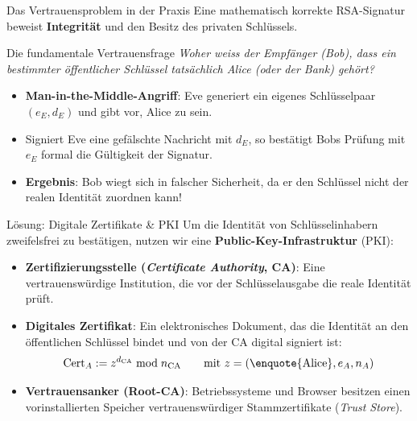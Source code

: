 \begin{frame}{Das Vertrauensproblem in der Praxis}
	Eine mathematisch korrekte RSA-Signatur beweist \textbf{Integrität} und den Besitz des privaten Schlüssels.
	
	\begin{alertblock}{Die fundamentale Vertrauensfrage}
		\emph{Woher weiss der Empfänger (Bob), dass ein bestimmter öffentlicher Schlüssel tatsächlich Alice (oder der Bank) gehört?}
	\end{alertblock}
	
	\begin{itemize}[<+->]
		\item \textbf{Man-in-the-Middle-Angriff}:
		      Eve generiert ein eigenes Schlüsselpaar $(e_E, d_E)$ und gibt vor, Alice zu sein.
		\item Signiert Eve eine gefälschte Nachricht mit $d_E$, so bestätigt Bobs Prüfung mit $e_E$ formal die Gültigkeit der Signatur.
		\item \textbf{Ergebnis}: Bob wiegt sich in falscher Sicherheit, da er den Schlüssel nicht der realen Identität zuordnen kann!
	\end{itemize}
\end{frame}

\begin{frame}{Lösung: Digitale Zertifikate \& PKI}
	Um die Identität von Schlüsselinhabern zweifelsfrei zu bestätigen, nutzen wir eine \textbf{Public-Key-Infrastruktur} (\acrshort{PKI}):
	
	\begin{mydefinition}
		{\small
		\begin{itemize}[<+->]
			\item \textbf{Zertifizierungsstelle (\emph{Certificate Authority}, \acrshort{CA})}:
			      Eine vertrauenswürdige Institution, die vor der Schlüsselausgabe die reale Identität prüft.
			\item \textbf{Digitales Zertifikat}:
			      Ein elektronisches Dokument, das die Identität an den öffentlichen Schlüssel bindet und von der \acrshort{CA} digital signiert ist:
			      \[ \text{Cert}_A := z^{d_{\text{CA}}} \bmod n_{\text{CA}} \qquad \text{mit } z = (\text{\enquote{Alice}}, e_A, n_A) \]
			\item \textbf{Vertrauensanker (Root-\acrshort{CA})}:
			      Betriebssysteme und Browser besitzen einen vorinstallierten Speicher vertrauenswürdiger Stammzertifikate (\emph{Trust Store}).
		\end{itemize}
		}
	\end{mydefinition}
\end{frame}

